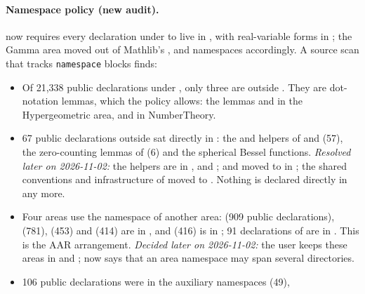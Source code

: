 \documentclass[11pt,a4paper]{article}
\begin{document}
\paragraph{Namespace policy (new audit).}
 now requires every declaration under  to live in
, with real-variable forms in ; the Gamma area
moved out of Mathlib's ,  and  namespaces
accordingly. A source scan that tracks \texttt{namespace} blocks finds:
\begin{itemize}
  \item Of 21{,}338 public declarations under , only three are outside
    . They are dot-notation lemmas, which the policy allows: the lemmas
     and
     in the Hypergeometric area, and
     in NumberTheory.
  \item 67 public declarations outside  sat directly in : the
     and  helpers of 
    and  (57), the  zero-counting lemmas of
     (6) and the spherical Bessel functions.
    \emph{Resolved later on 2026-11-02:} the helpers are in ,
     and ;
     and  moved to  in
    ; the shared conventions and infrastructure of 
    moved to . Nothing is declared directly in  any more.
  \item Four areas use the namespace of another area:  (909 public
    declarations),  (781),  (453) and
     (414) are in , and 
    (416) is in ; 91 declarations of  are in
    . This is the AAR arrangement. \emph{Decided later on 2026-11-02:}
    the user keeps these areas in  and ;
     now says that an area namespace may span several directories.
  \item 106 public declarations were in the auxiliary namespaces  (49),

\end{itemize}
\end{document}
